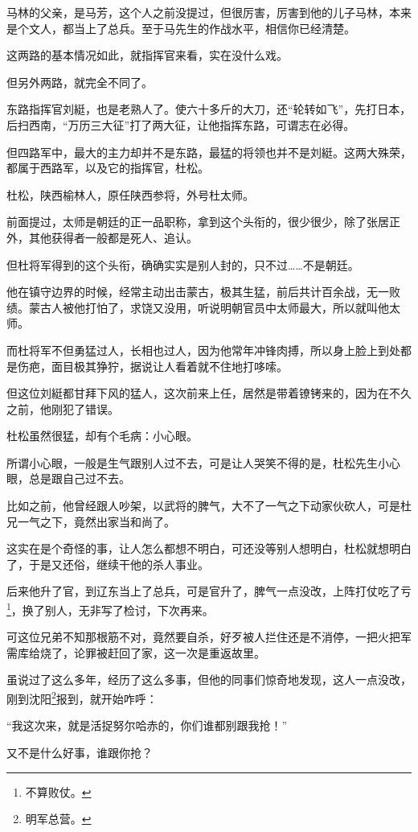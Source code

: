 \begin{multicols}{\theparacolNo}
马林的父亲，是马芳，这个人之前没提过，但很厉害，厉害到他的儿子马林，本来是个文人，都当上了总兵。至于马先生的作战水平，相信你已经清楚。

这两路的基本情况如此，就指挥官来看，实在没什么戏。

但另外两路，就完全不同了。

东路指挥官刘綎，也是老熟人了。使六十多斤的大刀，还“轮转如飞”，先打日本，后扫西南，“万历三大征”打了两大征，让他指挥东路，可谓志在必得。

但四路军中，最大的主力却并不是东路，最猛的将领也并不是刘綎。这两大殊荣，都属于西路军，以及它的指挥官，杜松。

杜松，陕西榆林人，原任陕西参将，外号杜太师。

前面提过，太师是朝廷的正一品职称，拿到这个头衔的，很少很少，除了张居正外，其他获得者一般都是死人、追认。

但杜将军得到的这个头衔，确确实实是别人封的，只不过……不是朝廷。

他在镇守边界的时候，经常主动出击蒙古，极其生猛，前后共计百余战，无一败绩。蒙古人被他打怕了，求饶又没用，听说明朝官员中太师最大，所以就叫他太师。

而杜将军不但勇猛过人，长相也过人，因为他常年冲锋肉搏，所以身上脸上到处都是伤疤，面目极其狰狞，据说让人看着就不住地打哆嗦。

但这位刘綎都甘拜下风的猛人，这次前来上任，居然是带着镣铐来的，因为在不久之前，他刚犯了错误。

杜松虽然很猛，却有个毛病：小心眼。

所谓小心眼，一般是生气跟别人过不去，可是让人哭笑不得的是，杜松先生小心眼，总是跟自己过不去。

比如之前，他曾经跟人吵架，以武将的脾气，大不了一气之下动家伙砍人，可是杜兄一气之下，竟然出家当和尚了。

这实在是个奇怪的事，让人怎么都想不明白，可还没等别人想明白，杜松就想明白了，于是又还俗，继续干他的杀人事业。

后来他升了官，到辽东当上了总兵，可是官升了，脾气一点没改，上阵打仗吃了亏\footnote{不算败仗。}，换了别人，无非写了检讨，下次再来。

可这位兄弟不知那根筋不对，竟然要自杀，好歹被人拦住还是不消停，一把火把军需库给烧了，论罪被赶回了家，这一次是重返故里。

虽说过了这么多年，经历了这么多事，但他的同事们惊奇地发现，这人一点没改，刚到沈阳\footnote{明军总营。}报到，就开始咋呼：

“我这次来，就是活捉努尔哈赤的，你们谁都别跟我抢！”

又不是什么好事，谁跟你抢？


\end{multicols}
